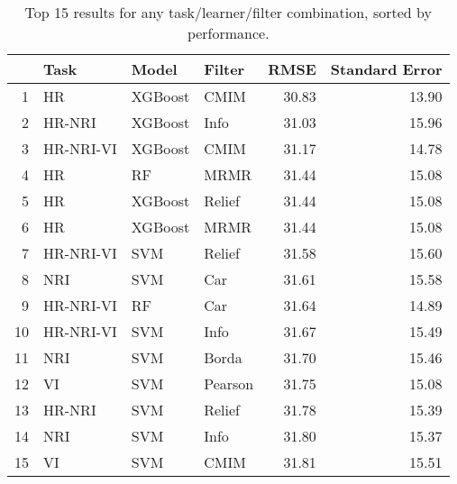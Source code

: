 \begin{table}[ht!]
\centering
\caption{Top 15 results for any task/learner/filter combination, sorted by performance.} 
\label{tab:perf-top-15}
\begin{tabular}{rlllrr}
  \hline
 & Task & Model & Filter & RMSE & Standard Error \\ 
  \hline
1 & HR & XGBoost & CMIM & 30.83 & 13.90 \\ 
  2 & HR-NRI & XGBoost & Info & 31.03 & 15.96 \\ 
  3 & HR-NRI-VI & XGBoost & CMIM & 31.17 & 14.78 \\ 
  4 & HR & RF & MRMR & 31.44 & 15.08 \\ 
  5 & HR & XGBoost & Relief & 31.44 & 15.08 \\ 
  6 & HR & XGBoost & MRMR & 31.44 & 15.08 \\ 
  7 & HR-NRI-VI & SVM & Relief & 31.58 & 15.60 \\ 
  8 & NRI & SVM & Car & 31.61 & 15.58 \\ 
  9 & HR-NRI-VI & RF & Car & 31.64 & 14.89 \\ 
  10 & HR-NRI-VI & SVM & Info & 31.67 & 15.49 \\ 
  11 & NRI & SVM & Borda & 31.70 & 15.46 \\ 
  12 & VI & SVM & Pearson & 31.75 & 15.08 \\ 
  13 & HR-NRI & SVM & Relief & 31.78 & 15.39 \\ 
  14 & NRI & SVM & Info & 31.80 & 15.37 \\ 
  15 & VI & SVM & CMIM & 31.81 & 15.51 \\ 
   \hline
\end{tabular}
\end{table}
